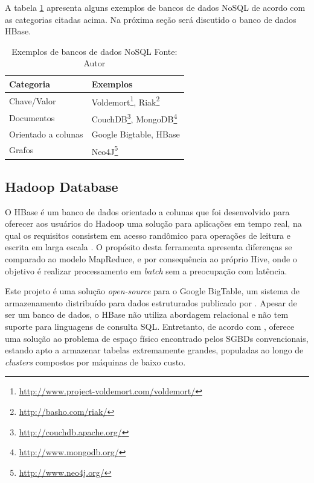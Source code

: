 A tabela \ref{tab-nosql} apresenta alguns exemplos de bancos de dados NoSQL de acordo com as categorias citadas acima. Na próxima seção será discutido o banco de dados HBase.

\begin{savenotes}
\begin{table}[!ht]
\begin{center}
  \begin{tabular}{|p{5cm}|p{3cm}|}
	\hline
	Categoria & Exemplos
	\\ \hline
	Chave/Valor & Voldemort\footnote{\url{http://www.project-voldemort.com/voldemort/}}, Riak\footnote{\url{http://basho.com/riak/}}
	\\ \hline
	Documentos & CouchDB\footnote{\url{http://couchdb.apache.org/}}, MongoDB\footnote{\url{http://www.mongodb.org/}}
	\\ \hline
	Orientado a colunas & Google Bigtable, HBase
	\\ \hline
	Grafos & Neo4J\footnote{\url{http://www.neo4j.org/}}
	\\ \hline
  \end{tabular}
  \captionsetup{justification=centering}
  \caption[Exemplos de bancos de dados NoSQL]{Exemplos de bancos de dados NoSQL
  \protect\linebreak Fonte: Autor}
\label{tab-nosql}
\end{center}
\end{table}
\end{savenotes}
\FloatBarrier

\subsection{Hadoop Database}

O HBase é um banco de dados orientado a colunas que foi desenvolvido para oferecer aos usuários do Hadoop uma solução para aplicações em tempo real, na qual os requisitos consistem em acesso randômico para operações de leitura e escrita em larga escala \cite{white2012}. O propósito desta ferramenta apresenta diferenças se comparado ao modelo MapReduce, e por consequência ao próprio Hive, onde o objetivo é realizar processamento em \textit{batch} sem a preocupação com latência.

Este projeto é uma solução \textit{open-source} para o Google BigTable, um sistema de armazenamento distribuído para dados estruturados publicado por . Apesar de ser um banco de dados, o HBase não utiliza abordagem relacional e não tem suporte para linguagens de consulta SQL. Entretanto, de acordo com , oferece uma solução ao problema de espaço físico encontrado pelos SGBDs convencionais, estando apto a armazenar tabelas extremamente grandes, populadas ao longo de \textit{clusters} compostos por máquinas de baixo custo.


